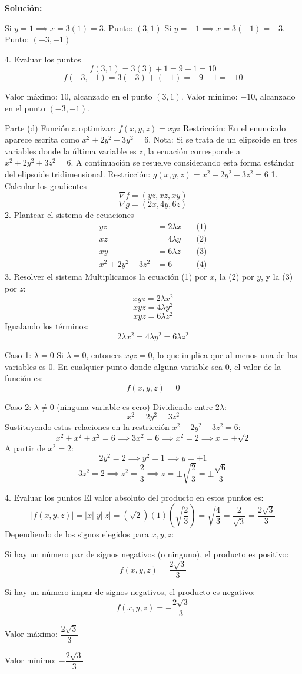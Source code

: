 \documentclass[12pt,a4paper]{report}
\newcommand{\solutionname}{Solución:}
\newenvironment{solution}{
 	\par\noindent\textbf{\color{structurecolor}\solutionname}
 	\color{black!90}}{\hfill\quad\par}
\begin{document}
\begin{solution}
\begin{enumerate}
Si $y = 1 \implies x = 3(1) = 3$. Punto: $(3, 1)$
Si $y = -1 \implies x = 3(-1) = -3$. Punto: $(-3, -1)$

4. Evaluar los puntos
$$f(3, 1) = 3(3) + 1 = 9 + 1 = 10$$
$$f(-3, -1) = 3(-3) + (-1) = -9 - 1 = -10$$

Valor máximo: $10$, alcanzado en el punto $(3, 1)$.
Valor mínimo: $-10$, alcanzado en el punto $(-3, -1)$.


Parte (d)
Función a optimizar: $f(x, y, z) = xyz$
Restricción: En el enunciado aparece escrita como $x^2 + 2y^2 + 3y^2 = 6$.
Nota: Si se trata de un elipsoide en tres variables donde la última variable es $z$, la ecuación corresponde a $x^2 + 2y^2 + 3z^2 = 6$. A continuación se resuelve considerando esta forma estándar del elipsoide tridimensional.
Restricción: $g(x, y, z) = x^2 + 2y^2 + 3z^2 = 6$
1. Calcular los gradientes
$$\nabla f = (yz, xz, xy)$$
$$\nabla g = (2x, 4y, 6z)$$
2. Plantear el sistema de ecuaciones
$$\begin{aligned}
yz &= 2\lambda x \quad &\text{(1)} \\
xz &= 4\lambda y \quad &\text{(2)} \\
xy &= 6\lambda z \quad &\text{(3)} \\
x^2 + 2y^2 + 3z^2 &= 6 \quad &\text{(4)}
\end{aligned}$$
3. Resolver el sistema
Multiplicamos la ecuación (1) por $x$, la (2) por $y$, y la (3) por $z$:
$$xyz = 2\lambda x^2$$
$$xyz = 4\lambda y^2$$
$$xyz = 6\lambda z^2$$
Igualando los términos:
$$2\lambda x^2 = 4\lambda y^2 = 6\lambda z^2$$


Caso 1: $\lambda = 0$
Si $\lambda = 0$, entonces $xyz = 0$, lo que implica que al menos una de las variables es $0$. En cualquier punto donde alguna variable sea $0$, el valor de la función es:
$$f(x, y, z) = 0$$


Caso 2: $\lambda \neq 0$ (ninguna variable es cero)
Dividiendo entre $2\lambda$:
$$x^2 = 2y^2 = 3z^2$$
Sustituyendo estas relaciones en la restricción $x^2 + 2y^2 + 3z^2 = 6$:
$$x^2 + x^2 + x^2 = 6 \implies 3x^2 = 6 \implies x^2 = 2 \implies x = \pm \sqrt{2}$$
A partir de $x^2 = 2$:
$$2y^2 = 2 \implies y^2 = 1 \implies y = \pm 1$$
$$3z^2 = 2 \implies z^2 = \frac{2}{3} \implies z = \pm \sqrt{\frac{2}{3}} = \pm \frac{\sqrt{6}}{3}$$


4. Evaluar los puntos
El valor absoluto del producto en estos puntos es:
$$|f(x, y, z)| = |x| |y| |z| = (\sqrt{2})(1)\left(\sqrt{\frac{2}{3}}\right) = \sqrt{\frac{4}{3}} = \frac{2}{\sqrt{3}} = \frac{2\sqrt{3}}{3}$$
Dependiendo de los signos elegidos para $x, y, z$:


Si hay un número par de signos negativos (o ninguno), el producto es positivo:
$$f(x, y, z) = \frac{2\sqrt{3}}{3}$$


Si hay un número impar de signos negativos, el producto es negativo:
$$f(x, y, z) = -\frac{2\sqrt{3}}{3}$$


Valor máximo: $\dfrac{2\sqrt{3}}{3}$


Valor mínimo: $-\dfrac{2\sqrt{3}}{3}$



\end{enumerate}
\end{solution}
\end{document}
